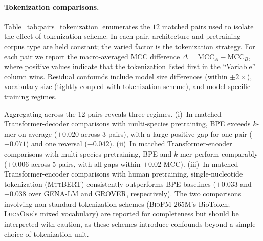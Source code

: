\documentclass{llmxive}
\begin{document}
\paragraph{Tokenization comparisons.}
\label{subsec:tokenization_controlled}
Table~\ref{tab:pairs_tokenization} enumerates the $12$ matched pairs
used to isolate the effect of tokenization scheme. In each pair,
architecture and pretraining corpus type are held constant; the varied
factor is the tokenization strategy. For each pair we report the
macro-averaged MCC difference $\Delta = \text{MCC}_A -
\text{MCC}_B$, where positive values indicate that the tokenization
listed first in the ``Variable'' column wins. Residual confounds include
model size differences (within $\pm 2\times$), vocabulary size (tightly
coupled with tokenization scheme), and model-specific training regimes.

Aggregating across the 12 pairs reveals three regimes. (i)~In matched
Transformer-decoder comparisons with multi-species pretraining, BPE
exceeds $k$-mer on average ($+0.020$ across 3 pairs), with a large
positive gap for one pair ($+0.071$) and one reversal ($-0.042$).
(ii)~In matched Transformer-encoder comparisons with multi-species
pretraining, BPE and $k$-mer perform comparably ($+0.006$ across 5
pairs, with all gaps within $\pm 0.02$ MCC).
(iii)~In matched Transformer-encoder comparisons with human
pretraining, single-nucleotide tokenization (\textsc{MutBERT})
consistently outperforms BPE baselines ($+0.033$ and $+0.038$ over
\textsc{GENA-LM} and \textsc{GROVER}, respectively). The two
comparisons involving non-standard tokenization schemes
(\textsc{BioFM-265M}'s BioToken; \textsc{LucaOne}'s mixed vocabulary)
are reported for completeness but should be interpreted with caution,
as these schemes introduce confounds beyond a simple choice of
tokenization unit.
\end{document}

